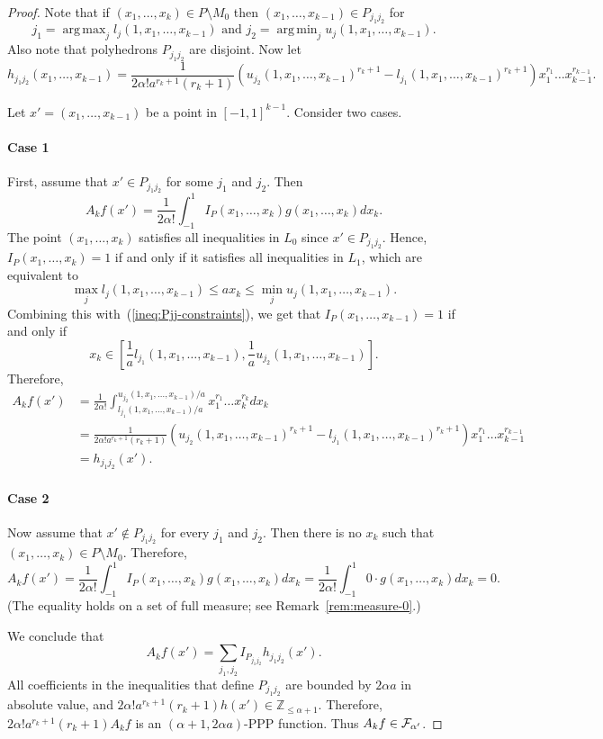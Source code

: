 \documentclass[11pt]{article}
\DeclareMathOperator*{\argmax}{arg\,max}
\DeclareMathOperator*{\argmin}{arg\,min}
\newcommand {\bbZ}    {\mathbb{Z}}
\newcommand {\calF}   {{\cal{F}}}
\begin{document}
\begin{proof}
Note that if $(x_1,\dots, x_k)\in P\setminus M_0$ then $(x_1,\dots,x_{k-1}) \in P_{j_1j_2}$ for
$$j_1 = \argmax_j  l_{j}(1,x_1,\dots,x_{k-1}) \text{ and } j_2 = \argmin_j  u_{j}(1,x_1,\dots,x_{k-1}).$$
Also note that polyhedrons $P_{j_1j_2}$ are disjoint.
Now let
$$h_{j_1j_2}(x_1,\dots, x_{k-1}) = \frac{1}{2\alpha! a^{r_k+1} (r_k+1)} (u_{j_2}(1,x_1,\dots,x_{k-1})^{r_k+1} - l_{j_1}(1,x_1,\dots,x_{k-1})^{r_k+1}) x_1^{r_1} \dots x_{k-1}^{r_{k-1}}.$$

Let $x' = (x_1,\dots, x_{k-1})$ be a point in $[-1,1]^{k-1}$. Consider two cases.
\medskip

\paragraph{Case 1} First, assume that $x'\in P_{j_1j_2}$ for some $j_1$ and $j_2$. Then
$$A_kf(x') = \frac{1}{2\alpha!}\int_{-1}^1 I_P(x_1,\dots,x_k) g(x_1,\dots,x_k) dx_k.$$
The point $(x_1,\dots, x_k)$ satisfies all inequalities in $L_0$ since $x'\in P_{j_1j_2}$.
Hence, $I_P(x_1,\dots,x_k) = 1$ if and only if it satisfies all inequalities in $L_1$, which are equivalent to
$$\max_j l_j(1,x_1,\dots,x_{k-1}) \leq ax_k \leq \min_j u_j(1,x_1,\dots,x_{k-1}).$$
Combining this with~(\ref{ineq:Pjj-constraints}), we get that $I_P(x_1,\dots,x_{k-1}) = 1$ if and only if
$$x_k \in \left[\frac{1}{a}l_{j_1}(1,x_1,\dots,x_{k-1}) , \frac{1}{a} u_{j_2}(1,x_1,\dots,x_{k-1})\right].$$
Therefore,
\begin{align*}
A_kf(x') &= \frac{1}{2\alpha!}\int_{l_{j_1}(1,x_1,\dots,x_{k-1}) /a}^{u_{j_2}(1,x_1,\dots,x_{k-1}) /a}  x_1^{r_1} \dots x_k^{r_k} dx_k\\
              &= \frac{1}{2\alpha! a^{r_k+1} (r_k+1)} (u_{j_2}(1,x_1,\dots,x_{k-1})^{r_k+1} - l_{j_1}(1,x_1,\dots,x_{k-1})^{r_k+1}) x_1^{r_1} \dots x_{k-1}^{r_{k-1}}\\
              &= h_{j_1j_2}(x').
\end{align*}

\paragraph{Case 2} Now assume that $x'\notin P_{j_1j_2}$ for every $j_1$ and $j_2$.  Then there is no $x_k$ such that $(x_1,\dots,x_k) \in P\setminus M_0$. Therefore,
$$A_kf(x') = \frac{1}{2\alpha!}\int_{-1}^1 I_P(x_1,\dots,x_k) g(x_1,\dots,x_k) dx_k = \frac{1}{2\alpha!} \int_{-1}^1 0 \cdot g(x_1,\dots,x_k)dx_k = 0.$$
(The equality holds on a set of full measure; see Remark~\ref{rem:measure-0}.)

We conclude that
$$A_kf(x') = \sum_{j_1,j_2} I_{P_{j_1j_2}} h_{j_1j_2}(x').$$
All coefficients in the inequalities that define $P_{j_1j_2}$ are bounded by $2\alpha a$ in absolute value, and
$2\alpha! a^{r_k+1} (r_k+1) h(x') \in \bbZ_{\leq \alpha + 1}$. Therefore,
$2\alpha! a^{r_k+1} (r_k+1) A_kf$ is an $(\alpha+1,2\alpha a)$-PPP function. Thus $A_k f\in\calF_{\alpha'}$.
\end{proof}
\end{document}
